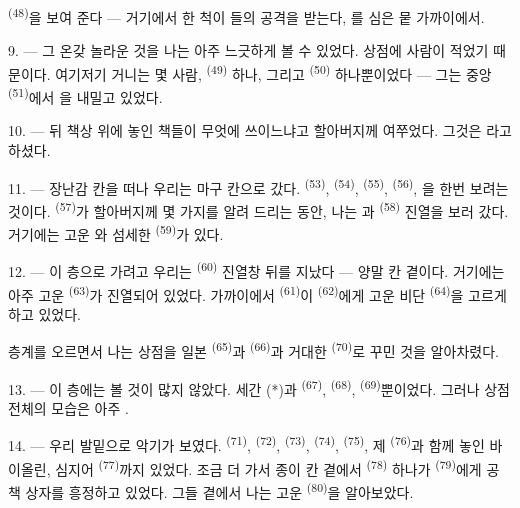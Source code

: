  \textsuperscript{(48)}을 보여 준다 — 거기에서  한 척이
들의 공격을 받는다, 를 심은 뭍 가까이에서.


9. --- 그 온갖 놀라운 것을 나는 아주 느긋하게 볼 수 있었다. 상점에 사람이 적었기
때문이다. 여기저기 거니는 몇 사람,  \textsuperscript{(49)} 하나, 그리고
 \textsuperscript{(50)} 하나뿐이었다 — 그는 중앙 
\textsuperscript{(51)}에서 을 내밀고 있었다.

10. ---  뒤 책상 위에 놓인 책들이 무엇에 쓰이느냐고 할아버지께
여쭈었다. 그것은 라고 하셨다.

\VUsaut{3.6mm}
\VUsaut{2.8mm}

11. --- 장난감 칸을 떠나 우리는 마구 칸으로 갔다.  \textsuperscript{(53)},
 \textsuperscript{(54)},  \textsuperscript{(55)},
 \textsuperscript{(56)}, 을 한번 보려는 것이다.
 \textsuperscript{(57)}가 할아버지께 몇 가지를 알려 드리는 동안, 나는
과  \textsuperscript{(58)} 진열을 보러 갔다. 거기에는
고운 와 섬세한  \textsuperscript{(59)}가 있다.

12. --- 이 층으로 가려고 우리는  \textsuperscript{(60)} 진열창 뒤를
지났다 — 양말 칸 곁이다. 거기에는 아주 고운  \textsuperscript{(63)}가
진열되어 있었다. 가까이에서  \textsuperscript{(61)}이 
\textsuperscript{(62)}에게 고운 비단  \textsuperscript{(64)}을 고르게 하고
있었다.

층계를 오르면서 나는 상점을 일본  \textsuperscript{(65)}과
 \textsuperscript{(66)}과 거대한  \textsuperscript{(70)}로
꾸민 것을 알아차렸다.

13. --- 이 층에는 볼 것이 많지 않았다. 세간 (*)과  \textsuperscript{(67)},
 \textsuperscript{(68)},  \textsuperscript{(69)}뿐이었다.
그러나 상점 전체의 모습은 아주 .

14. --- 우리 발밑으로 악기가 보였다.  \textsuperscript{(71)},
 \textsuperscript{(72)},  \textsuperscript{(73)},
 \textsuperscript{(74)},  \textsuperscript{(75)},
제  \textsuperscript{(76)}과 함께 놓인 바이올린, 심지어 
\textsuperscript{(77)}까지 있었다. 조금 더 가서 종이 칸 곁에서  \textsuperscript{(78)}
하나가  \textsuperscript{(79)}에게 공책 상자를 흥정하고 있었다. 그들 곁에서
나는 고운  \textsuperscript{(80)}을 알아보았다.

